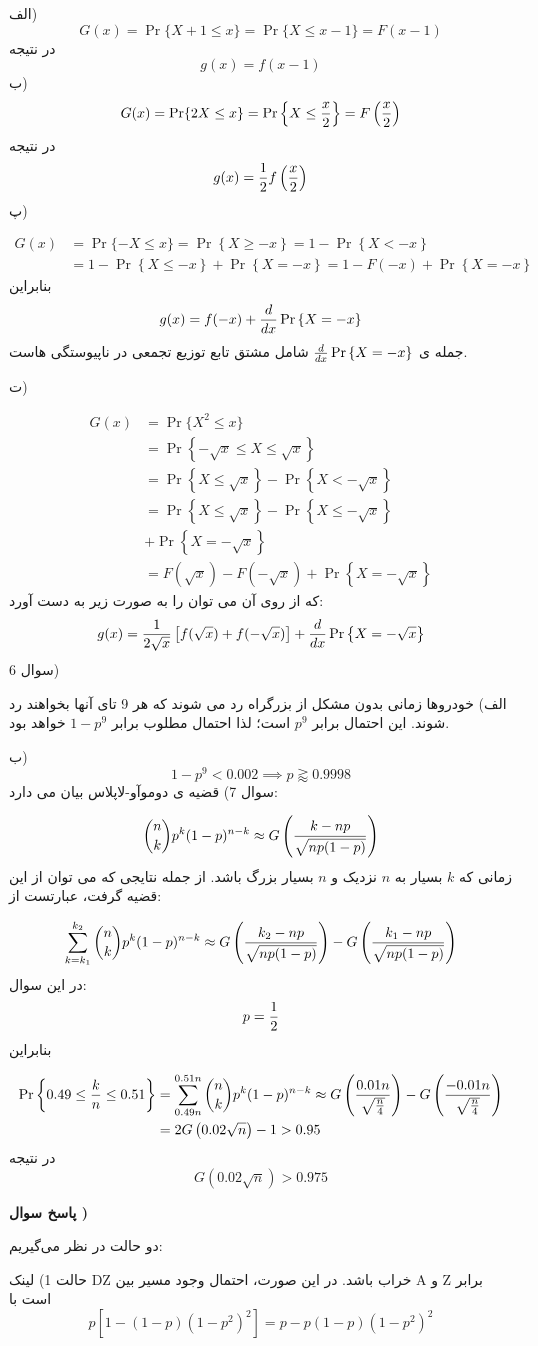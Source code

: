 \documentclass[10pt,letterpaper]{report}
\newcounter{questionanswernumber}
\newcommand{\QA}{
\textbf{پاسخ سوال \thequestionanswernumber)}
\stepcounter{questionanswernumber}
}
\newcommand{\eqn}[1]{
\[\begin{split}
#1
\end{split}\]
}
\begin{document}
الف)
$$G(x)=\Pr\{X+1\le x\}=\Pr\{X\le x-1\}=F(x-1)$$
در نتیجه
$$g(x)=f(x-1)$$
ب)
$$G(x)=\Pr\{2X\le x\}=\Pr\left\{X\le {x\over 2}\right\}=F\left({x\over 2}\right)$$
در نتیجه
$$
g(x)={1\over 2}f\left({x\over 2}\right)
$$
پ)
\eqn{
G(x)&=\Pr\{-X\le x\}
=\Pr\left\{X\ge -x\right\}
=1-\Pr\left\{X< -x\right\}
\\&=1-\Pr\left\{X\le-x\right\}+\Pr\left\{X=-x\right\}
=1-F(-x)+\Pr\left\{X=-x\right\}
}{}
بنابراین
$$g(x)=f(-x)+{d\over dx}\Pr\left\{X=-x\right\}$$
جمله ی ${d\over dx}\Pr\left\{X=-x\right\}$ شامل مشتق تابع توزیع تجمعی در ناپیوستگی هاست.

ت)
\eqn{
G(x)&=\Pr\{X^2\le x\}
\\&=\Pr\left\{-\sqrt x\le X\le \sqrt x\right\}
\\&=\Pr\left\{X\le \sqrt x\right\}-\Pr\left\{X<-\sqrt x\right\}
\\&=\Pr\left\{X\le \sqrt x\right\}-\Pr\left\{X\le-\sqrt x\right\}
\\&+\Pr\left\{X=-\sqrt x\right\}
\\&=F(\sqrt x)-F(-\sqrt x)+\Pr\left\{X=-\sqrt x\right\}
}{}
که از روی آن می توان  را به صورت زیر به دست آورد:
$$
g(x)={1\over 2\sqrt x}\left[f(\sqrt x)+f(-\sqrt x)\right]+{d\over dx}\Pr\left\{X=-\sqrt x\right\}
$$
سوال 6)

الف) خودروها زمانی بدون مشکل از بزرگراه رد می شوند که هر 9 تای آنها بخواهند رد شوند. این احتمال برابر $p^9$ است؛ لذا احتمال مطلوب برابر $1-p^9$ خواهد بود.

ب) 
$$
1-p^9<0.002\implies p\gtrapprox 0.9998
$$
سوال 7) قضیه ی دوموآو-لاپلاس بیان می دارد:
\eqn{
\binom{n}{k}p^k(1-p)^{n-k}\approx G\left({k-np\over\sqrt{np(1-p)}}\right)
}{}
زمانی که $k$ بسیار به $n$ نزدیک و $n$ بسیار بزرگ باشد. از جمله نتایجی که می توان از این قضیه گرفت، عبارتست از:
\eqn{
\sum_{k=k_1}^{k_2}\binom{n}{k}p^k(1-p)^{n-k}\approx
G\left({k_2-np\over\sqrt{np(1-p)}}\right)
-
G\left({k_1-np\over\sqrt{np(1-p)}}\right)
}{}
در این سوال:
$$
p={1\over 2}
$$
بنابراین
\eqn{
\Pr\left\{0.49\le{k\over n}\le0.51\right\}&=
\sum_{0.49n}^{0.51n}\binom{n}{k}p^k(1-p)^{n-k}
\approx
G\left({0.01n\over\sqrt{n\over 4}}\right)-G\left({-0.01n\over\sqrt{n\over 4}}\right)
\\&=
2G\left({0.02\sqrt n}\right)-1>0.95
}{}
در نتیجه
$$
G\left({0.02\sqrt n}\right)>0.975
$$

\QA

دو حالت در نظر می‌گیریم:

حالت 1) لینک DZ خراب باشد. در این صورت، احتمال وجود مسیر بین A و Z برابر است با
$$
p[1-(1-p)(1-p^2)^2]=p-p(1-p)(1-p^2)^2
$$
\end{document}
